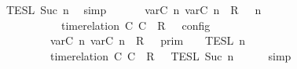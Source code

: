\begin{isabellebody}
\ \ \ \ \ \ \ \ {\isasyminter}\ {\isasymlbrakk}{\isasymlbrakk}\ {\isasymPhi}\ {\isasymrbrakk}{\isasymrbrakk}\isactrlsub T\isactrlsub E\isactrlsub S\isactrlsub L\isactrlbsup {\isasymge}\ Suc\ n\isactrlesup {\isacartoucheclose}\ \isamarkupfalse%
\ simp\isanewline
\ \ \isamarkupfalse%
\ \isamarkupfalse%
\ {\isacartoucheopen}{\isasymlbrakk}\ {\isacharparenleft}{\isacharparenleft}{\isasymlfloor}{\isasymtau}\isactrlsub v\isactrlsub a\isactrlsub r{\isacharparenleft}C\ n{\isacharparenright}{\isacharcomma}\ {\isasymtau}\isactrlsub v\isactrlsub a\isactrlsub r{\isacharparenleft}C\ n{\isacharparenright}{\isasymrfloor}\ {\isasymin}\ R{\isacharparenright}\ {\isacharhash}\ {\isasymGamma}{\isacharparenright}{\isacharcomma}\ n\isanewline
\ \ \ \ \ \ \ \ \ \ \ \ \ \ \ \ \ \ {\isasymTurnstile}\ {\isasymPsi}\ {\isasymtriangleright}\ {\isacharparenleft}{\isacharparenleft}time{\isacharminus}relation\ {\isasymlfloor}C\ C\ {\isasymin}\ R{\isacharparenright}\ {\isacharhash}\ {\isasymPhi}{\isacharparenright}\ {\isasymrbrakk}\isactrlsub c\isactrlsub o\isactrlsub n\isactrlsub f\isactrlsub i\isactrlsub g\isanewline
\ \ \ \ \ \ \ \ \ \ \ \ \ \ \ \ \ {\isacharequal}\ {\isasymlbrakk}{\isasymlbrakk}\ {\isacharparenleft}{\isasymlfloor}{\isasymtau}\isactrlsub v\isactrlsub a\isactrlsub r{\isacharparenleft}C\ n{\isacharparenright}{\isacharcomma}\ {\isasymtau}\isactrlsub v\isactrlsub a\isactrlsub r{\isacharparenleft}C\ n{\isacharparenright}{\isasymrfloor}\ {\isasymin}\ R{\isacharparenright}\ {\isacharhash}\ {\isasymGamma}\ {\isasymrbrakk}{\isasymrbrakk}\isactrlsub p\isactrlsub r\isactrlsub i\isactrlsub m\ {\isasyminter}\ {\isasymlbrakk}{\isasymlbrakk}\ {\isasymPsi}\ {\isasymrbrakk}{\isasymrbrakk}\isactrlsub T\isactrlsub E\isactrlsub S\isactrlsub L\isactrlbsup {\isasymge}\ n\isactrlesup \isanewline
\ \ \ \ \ \ \ \ \ \ \ \ \ \ \ \ \ {\isasyminter}\ {\isasymlbrakk}{\isasymlbrakk}\ {\isacharparenleft}time{\isacharminus}relation\ {\isasymlfloor}C\ C\ {\isasymin}\ R{\isacharparenright}\ {\isacharhash}\ {\isasymPhi}\ {\isasymrbrakk}{\isasymrbrakk}\isactrlsub T\isactrlsub E\isactrlsub S\isactrlsub L\isactrlbsup {\isasymge}\ Suc\ n\isactrlesup {\isacartoucheclose}\isanewline
\ \ \ \ \isamarkupfalse%
\ simp\isanewline

\end{isabellebody}
